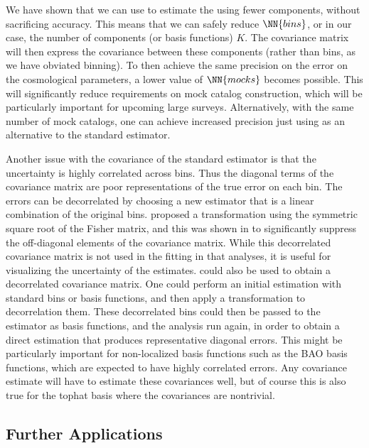 We have shown that we can use \est to estimate the \cf using fewer components, without sacrificing accuracy.
This means that we can safely reduce $\NN{bins}$, or in our case, the number of components (or basis functions) $K$.
The covariance matrix will then express the covariance between these components (rather than bins, as we have obviated binning).
To then achieve the same precision on the error on the cosmological parameters, a lower value of $\NN{mocks}$ becomes possible.
This will significantly reduce requirements on mock catalog construction, which will be particularly important for upcoming large surveys. 
Alternatively, with the same number of mock catalogs, one can achieve increased precision just using \est as an alternative to the standard estimator.

Another issue with the covariance of the standard estimator is that the uncertainty is highly correlated across bins.
Thus the diagonal terms of the covariance matrix are poor representations of the true error on each bin.
The errors can be decorrelated by choosing a new estimator that is a linear combination of the original \cf bins. 
\cite{Hamilton2000} proposed a transformation using the symmetric square root of the Fisher matrix, and this was shown in \cite{Anderson2014} to significantly suppress the off-diagonal elements of the covariance matrix.
While this decorrelated covariance matrix is not used in the fitting in that analyses, it is useful for visualizing the uncertainty of the \cf estimates.
\Est could also be used to obtain a decorrelated covariance matrix.
One could perform an initial estimation with standard bins or basis functions, and then apply a transformation to decorrelation them.
These decorrelated bins could then be passed to the estimator as basis functions, and the analysis run again, in order to obtain a direct estimation that produces representative diagonal errors.
This might be particularly important for non-localized basis functions such as the BAO basis functions, which are expected to have highly correlated errors.
Any covariance estimate will have to estimate these covariances well, but of course this is also true for the tophat basis where the covariances are nontrivial.

\subsection{Further Applications}
\label{sec:applications}

